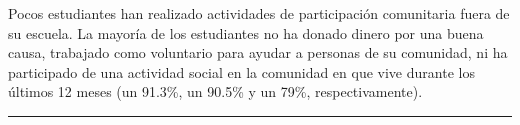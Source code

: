 \documentclass[
  14pt,
]{book}
\begin{document}
Pocos estudiantes han realizado actividades de participación comunitaria fuera de su escuela. La mayoría de los estudiantes no ha donado dinero por una buena causa, trabajado como voluntario para ayudar a personas de su comunidad, ni ha participado de una actividad social en la comunidad en que vive durante los últimos 12 meses (un 91.3\%, un 90.5\% y un 79\%, respectivamente).

\begin{center}\rule{0.5\linewidth}{0.5pt}\end{center}

  
\end{document}
